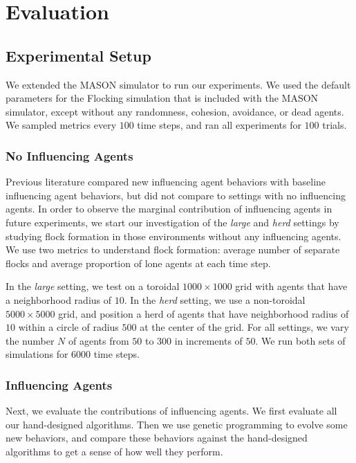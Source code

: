 
\chapter{Evaluation}
\label{ch:evaluation}

\section{Experimental Setup}

We extended the MASON simulator to run our experiments\cite{luke05mason}.
We used the default parameters for the Flocking simulation that is included
with the MASON simulator, except without any randomness, cohesion, avoidance,
or dead agents.
We sampled metrics every $100$ time steps, and ran all experiments for $100$
trials.

\subsection{No Influencing Agents}
Previous literature compared new influencing agent behaviors with baseline
influencing agent behaviors, but did not compare to settings with no
influencing agents.
In order to observe the marginal contribution of influencing agents
in future experiments, we start our investigation of the \textit{large} and
\textit{herd} settings by studying flock formation in those environments
without any influencing agents.
We use two metrics to understand flock formation: average number of separate
flocks and average proportion of lone agents at each time step.

In the \textit{large} setting, we test on a toroidal $1000\times1000$ grid with
agents that have a neighborhood radius of $10$.
In the \textit{herd} setting, we use a non-toroidal $5000\times5000$ grid, and
position a herd of agents that have neighborhood radius of $10$ within a circle
of radius $500$ at the center of the grid.
For all settings, we vary the number $N$ of agents from $50$ to $300$ in
increments of $50$.
We run both sets of simulations for $6000$ time steps.

\subsection{Influencing Agents}
Next, we evaluate the contributions of influencing agents.
We first evaluate all our hand-designed algorithms.
Then we use genetic programming to evolve some new behaviors, and compare these
behaviors against the hand-designed algorithms to get a sense of how well
they perform.

